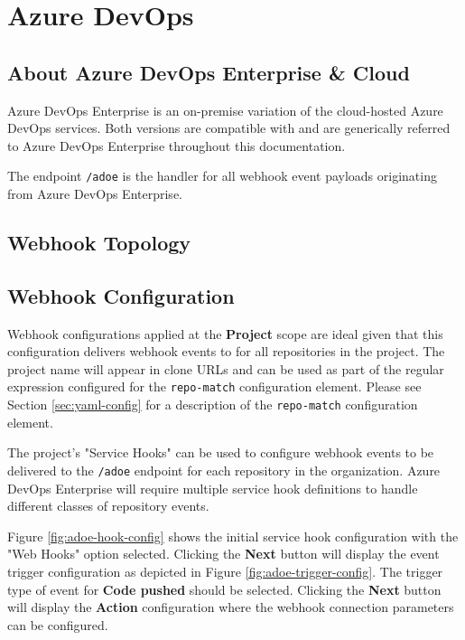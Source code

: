 \chapter{Azure DevOps}


\section{About Azure DevOps Enterprise \& Cloud}

Azure DevOps Enterprise is an on-premise variation of the cloud-hosted Azure DevOps services.
Both versions are compatible with \cxoneflow and are generically referred to Azure DevOps Enterprise
throughout this documentation.

The \cxoneflow endpoint \texttt{/adoe} is the handler for all webhook event
payloads originating from Azure DevOps Enterprise.  

\section{Webhook Topology}




\section{Webhook Configuration}

Webhook configurations applied at the \textbf{Project} scope are ideal given
that this configuration delivers webhook events to \cxoneflow for all repositories in the project.
The project name will appear in clone URLs and can be used as part of the regular expression configured
for the \texttt{repo-match} configuration element.  Please see Section \ref{sec:yaml-config} for a description
of the \texttt{repo-match} configuration element.

The project's "Service Hooks" can be used to configure webhook events to be delivered to the
\cxoneflow \texttt{/adoe} endpoint for each repository in the organization.  Azure DevOps
Enterprise will require multiple service hook definitions to handle different classes
of repository events.

Figure \ref{fig:adoe-hook-config} shows the initial service hook configuration with the 
"Web Hooks" option selected.  Clicking the \textbf{Next} button will display the 
event trigger configuration as depicted in Figure \ref{fig:adoe-trigger-config}. 
The trigger type of event for \textbf{Code pushed} should be selected.
Clicking the \textbf{Next} button will display the \textbf{Action} configuration
where the webhook connection parameters can be configured.

